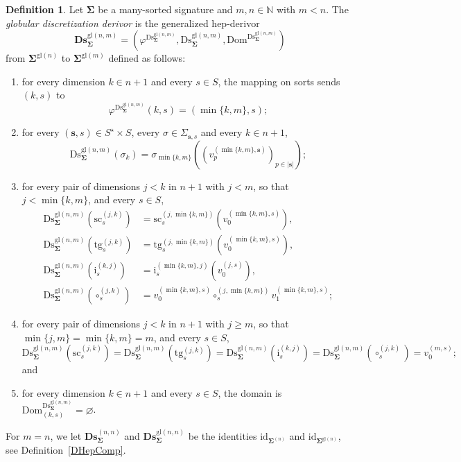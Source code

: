 \documentclass[a4paper, reqno
]{amsart}
\newcommand{\bb}[1]{\ensuremath{\lvert #1 \rvert}}
\newcommand{\sig}[1]{\mathbf{#1}}             %
\newcommand{\Dom}{\mathrm{Dom}}
\newcommand{\id}{\mathrm{id}}
\newcommand{\gl}{\mathrm{gl}}                %
\newcommand{\src}{\mathrm{sc}}
\newcommand{\tgt}{\mathrm{tg}}
\newcommand{\Ds}{\mathrm{Ds}}
\newcommand{\bDs}{\mathbf{Ds}}
\theoremstyle{plain}
\theoremstyle{definition}
\newtheorem{definition}[theorem]{Definition}
\begin{document}
\begin{definition}\label{DDiscGlDerivor}
Let $\sig{\Sigma}$ be a many-sorted signature and $m,n\in\mathbb{N}$ with $m<n$.
The \emph{globular discretization derivor} is the generalized hep-derivor
$$
\bDs^{\gl(n,m)}_{\sig{\Sigma}}=\left(\varphi^{\Ds^{\gl(n,m)}_{\sig{\Sigma}}},\Ds^{\gl(n,m)}_{\sig{\Sigma}},\Dom^{\Ds^{\gl(n,m)}_{\sig{\Sigma}}}\right)
$$
from $\sig{\Sigma}^{\gl(n)}$ to $\sig{\Sigma}^{\gl(m)}$ defined as follows:
\begin{enumerate}
\item for every dimension $k\in n+1$ and every $s\in S$, the mapping on sorts sends $(k,s)$ to
$$
\varphi^{\Ds^{\gl(n,m)}_{\sig{\Sigma}}}(k,s)=(\min\{k,m\},s);
$$
\item for every $(\mathbf{s},s)\in S^{\star}\times S$, every $\sigma\in\Sigma_{\mathbf{s},s}$ and every $k\in n+1$,
$$
\Ds^{\gl(n,m)}_{\sig{\Sigma}}(\sigma_{k})=\sigma_{\min\{k,m\}}\left(\left(v^{(\min\{k,m\},\mathbf{s})}_{p}\right)_{p\in\bb{\mathbf{s}}}\right);
$$
\item for every pair of dimensions $j<k$ in $n+1$ with $j<m$, so that $j<\min\{k,m\}$, and every $s\in S$,
\begin{align*}
\Ds^{\gl(n,m)}_{\sig{\Sigma}}(\src^{(j,k)}_{s})&=\src^{(j,\min\{k,m\})}_{s}\left(v^{(\min\{k,m\},s)}_{0}\right),\\
\Ds^{\gl(n,m)}_{\sig{\Sigma}}(\tgt^{(j,k)}_{s})&=\tgt^{(j,\min\{k,m\})}_{s}\left(v^{(\min\{k,m\},s)}_{0}\right),\\
\Ds^{\gl(n,m)}_{\sig{\Sigma}}(\mathrm{i}^{(k,j)}_{s})&=\mathrm{i}^{(\min\{k,m\},j)}_{s}\left(v^{(j,s)}_{0}\right),\\
\Ds^{\gl(n,m)}_{\sig{\Sigma}}(\circ^{(j,k)}_{s})&=v^{(\min\{k,m\},s)}_{0}\circ^{(j,\min\{k,m\})}_{s}v^{(\min\{k,m\},s)}_{1};
\end{align*}
\item for every pair of dimensions $j<k$ in $n+1$ with $j\geq m$, so that $\min\{j,m\}=\min\{k,m\}=m$, and every $s\in S$,
$$
\Ds^{\gl(n,m)}_{\sig{\Sigma}}(\src^{(j,k)}_{s})=
\Ds^{\gl(n,m)}_{\sig{\Sigma}}(\tgt^{(j,k)}_{s})=
\Ds^{\gl(n,m)}_{\sig{\Sigma}}(\mathrm{i}^{(k,j)}_{s})=
\Ds^{\gl(n,m)}_{\sig{\Sigma}}(\circ^{(j,k)}_{s})=v^{(m,s)}_{0};
$$
and
\item for every dimension $k\in n+1$ and every $s\in S$, the domain is $\Dom^{\Ds^{\gl(n,m)}_{\sig{\Sigma}}}_{(k,s)}=\varnothing$.
\end{enumerate}
For $m=n$, we let $\bDs^{(n,n)}_{\sig{\Sigma}}$ and $\bDs^{\gl(n,n)}_{\sig{\Sigma}}$ be the identities $\id_{\sig{\Sigma}^{(n)}}$ and $\id_{\sig{\Sigma}^{\gl(n)}}$, see Definition~\ref{DHepComp}.
\end{definition}
\end{document}
